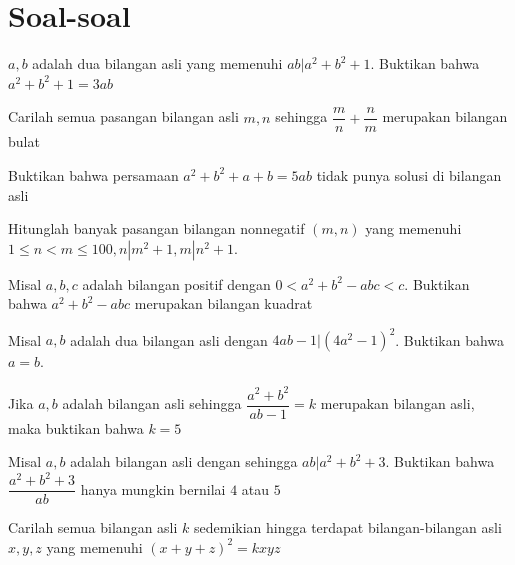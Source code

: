 \documentclass[11pt]{scrartcl}
\begin{document}
\section{Soal-soal}
\begin{problem}
    $a, b$ adalah dua bilangan asli yang memenuhi $ab|a^2 + b^2 + 1$. Buktikan bahwa $a^2 + b^2 + 1 = 3ab$
\end{problem}

\begin{problem}
    Carilah semua pasangan bilangan asli $m, n$ sehingga $\dfrac{m}{n} + \dfrac{n}{m}$ merupakan bilangan bulat
\end{problem}

\begin{problem}
    Buktikan bahwa persamaan $a^2 + b^2 + a + b = 5ab$ tidak punya solusi di bilangan asli
\end{problem}

\begin{problem}
    Hitunglah banyak pasangan bilangan nonnegatif $(m, n)$ yang memenuhi $1 \leq n < m \leq 100, n|m^2 + 1, m|n^2 + 1$.
\end{problem}

\begin{problem}
     Misal $a, b, c$ adalah bilangan positif dengan $0 < a^2 + b^2 - abc < c$. Buktikan bahwa $a^2 + b^2 - abc$ merupakan bilangan kuadrat
\end{problem}

\begin{problem}
    [IMO 2007 P5] Misal $a, b$ adalah dua bilangan asli dengan $4ab - 1|(4a^2 - 1)^2$. Buktikan bahwa $a = b$. 
\end{problem}

\begin{problem}
    Jika $a, b$ adalah bilangan asli sehingga $\dfrac{a^2 + b^2}{ab - 1} = k$ merupakan bilangan asli, maka buktikan bahwa $k = 5$
\end{problem}

\begin{problem}
     Misal $a, b$ adalah bilangan asli dengan sehingga $ab|a^2 + b^2 + 3$. Buktikan bahwa $\dfrac{a^2 + b^2 + 3}{ab}$ hanya mungkin bernilai $4$ atau $5$
\end{problem}

\begin{problem}
    [AMM 1994] Carilah semua bilangan asli $k$ sedemikian hingga terdapat bilangan-bilangan asli $x, y, z$ yang memenuhi $(x + y + z)^2 = kxyz$
\end{problem}
\end{document}
